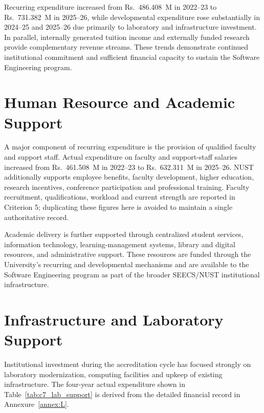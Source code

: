 Recurring expenditure increased from Rs.~486.408~M in 2022--23 to Rs.~731.382~M in 2025--26, while developmental expenditure rose substantially in 2024--25 and 2025--26 due primarily to laboratory and infrastructure investment. In parallel, internally generated tuition income and externally funded research provide complementary revenue streams. These trends demonstrate continued institutional commitment and sufficient financial capacity to sustain the Software Engineering program.

\hypertarget{human-resource-academic-support-c7}{%
\section{Human Resource and Academic Support}\label{human-resource-academic-support-c7}}

A major component of recurring expenditure is the provision of qualified faculty and support staff. Actual expenditure on faculty and support-staff salaries increased from Rs.~461.508~M in 2022--23 to Rs.~632.311~M in 2025--26. NUST additionally supports employee benefits, faculty development, higher education, research incentives, conference participation and professional training. Faculty recruitment, qualifications, workload and current strength are reported in Criterion 5; duplicating these figures here is avoided to maintain a single authoritative record.

Academic delivery is further supported through centralized student services, information technology, learning-management systems, library and digital resources, and administrative support. These resources are funded through the University's recurring and developmental mechanisms and are available to the Software Engineering program as part of the broader SEECS/NUST institutional infrastructure.

\hypertarget{infrastructure-laboratory-support-c7}{%
\section{Infrastructure and Laboratory Support}\label{infrastructure-laboratory-support-c7}}

Institutional investment during the accreditation cycle has focused strongly on laboratory modernization, computing facilities and upkeep of existing infrastructure. The four-year actual expenditure shown in Table~\ref{tab:c7_lab_support} is derived from the detailed financial record in Annexure~\ref{annex:L}.

